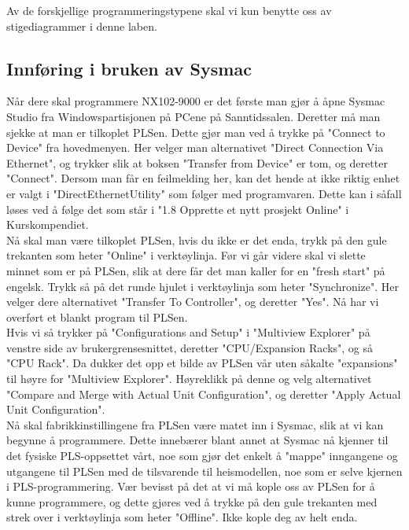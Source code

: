 \begin{alphasection}
Av de forskjellige programmeringstypene skal vi kun benytte oss av stigediagrammer i denne laben.

\subsection{Innføring i bruken av Sysmac}
Når dere skal programmere NX102-9000 er det første man gjør å åpne Sysmac Studio fra Windowspartisjonen på PCene på Sanntidssalen. Deretter må man sjekke at man er tilkoplet PLSen. Dette gjør man ved å trykke på "Connect to Device" fra hovedmenyen. Her velger man alternativet "Direct Connection Via Ethernet", og trykker slik at boksen "Transfer from Device" er tom, og deretter "Connect". Dersom man får en feilmelding her, kan det hende at ikke riktig enhet er valgt i "DirectEthernetUtility" som følger med programvaren. Dette kan i såfall løses ved å følge det som står i "1.8 Opprette et nytt prosjekt Online" i Kurskompendiet.\\

Nå skal man være tilkoplet PLSen, hvis du ikke er det enda, trykk på den gule trekanten som heter "Online" i verktøylinja. Før vi går videre skal vi slette minnet som er på PLSen, slik at dere får det man kaller for en "fresh start" på engelsk. Trykk så på det runde hjulet i verktøylinja som heter "Synchronize". Her velger dere alternativet "Transfer To Controller", og deretter "Yes". Nå har vi overført et blankt program til PLSen.\\

Hvis vi så trykker på "Configurations and Setup" i "Multiview Explorer" på venstre side av brukergrensesnittet, deretter "CPU/Expansion Racks", og så "CPU Rack". Da dukker det opp et bilde av PLSen vår uten såkalte "expansions" til høyre for "Multiview Explorer". Høyreklikk på denne og velg alternativet "Compare and Merge with Actual Unit Configuration", og deretter "Apply Actual Unit Configuration".\\

Nå skal fabrikkinstillingene fra PLSen være matet inn i Sysmac, slik at vi kan begynne å programmere. Dette innebærer blant annet at Sysmac nå kjenner til det fysiske PLS-oppsettet vårt, noe som gjør det enkelt å "mappe" inngangene og utgangene til PLSen med de tilsvarende til heismodellen, noe som er selve kjernen i PLS-programmering. Vær bevisst på det at vi må kople oss av PLSen for å kunne programmere, og dette gjøres ved å trykke på den gule trekanten med strek over i verktøylinja som heter "Offline". Ikke kople deg av helt enda.


\end{alphasection}
